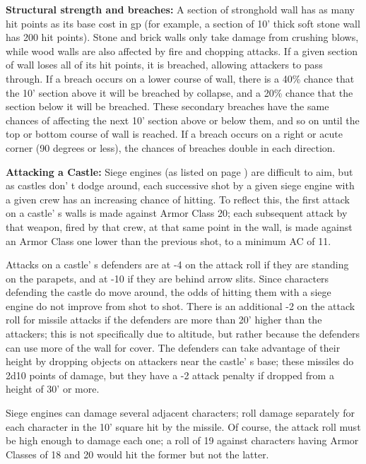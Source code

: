 \documentclass[a4paper,twoside,openany,10pt]{book}
\begin{document}
\begin{multicols}{2}
\textbf{Structural strength and breaches:} A section of stronghold wall has as many hit points as its base cost in gp (for example, a section of 10' thick soft stone wall has 200 hit points). Stone and brick walls only take damage from crushing blows, while wood walls are also affected by fire and chopping attacks. If a given section of wall loses all of its hit points, it is breached, allowing attackers to pass through. If a breach occurs on a lower course of wall, there is a 40\% chance that the 10' section above it will be breached by collapse, and a 20\% chance that the section below it will be breached. These secondary breaches have the same chances of affecting the next 10' section above or below them, and so on until the top or bottom course of wall is reached. If a breach occurs on a right or acute corner (90 degrees or less), the chances of breaches double in each direction.

\textbf{Attacking a Castle: } Siege engines (as listed on page \hyperlink{siege-engines}{\pageref{siege-engines}}) are difficult to aim, but as castles don' t dodge around, each successive shot by a given siege engine with a given crew has an increasing chance of hitting. To reflect this, the first attack on a castle' s walls is made against Armor Class 20; each subsequent attack by that weapon, fired by that crew, at that same point in the wall, is made against an Armor Class one lower than the previous shot, to a minimum AC of 11.

Attacks on a castle' s defenders are at -4 on the attack roll if they are standing on the parapets, and at -10 if they are behind arrow slits. Since characters defending the castle do move around, the odds of hitting them with a siege engine do not improve from shot to shot. There is an additional -2 on the attack roll for missile attacks if the defenders are more than 20' higher than the attackers; this is not specifically due to altitude, but rather because the defenders can use more of the wall for cover. The defenders can take advantage of their height by dropping objects on attackers near the castle' s base; these missiles do 2d10 points of damage, but they have a -2 attack penalty if dropped from a height of 30' or more.

Siege engines can damage several adjacent characters; roll damage separately for each character in the 10' square hit by the missile. Of course, the attack roll must be high enough to damage each one; a roll of 19 against characters having Armor Classes of 18 and 20 would hit the former but not the latter.


\end{multicols}
\end{document}
